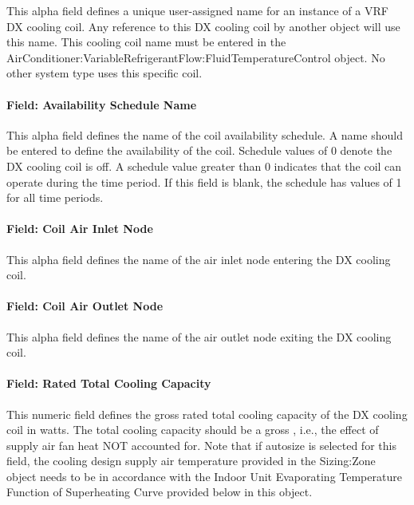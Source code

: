 This alpha field defines a unique user-assigned name for an instance of a VRF DX cooling coil. Any reference to this DX cooling coil by another object will use this name. This cooling coil name must be entered in the AirConditioner:VariableRefrigerantFlow:FluidTemperatureControl object. No other system type uses this specific coil.

\paragraph{Field: Availability Schedule Name}\label{field-availability-schedule-name-3-003}

This alpha field defines the name of the coil availability schedule. A name should be entered to define the availability of the coil. Schedule values of 0 denote the DX cooling coil is off. A schedule value greater than 0 indicates that the coil can operate during the time period. If this field is blank, the schedule has values of 1 for all time periods.

\paragraph{Field: Coil Air Inlet Node}\label{field-coil-air-inlet-node-1}

This alpha field defines the name of the air inlet node entering the DX cooling coil.

\paragraph{Field: Coil Air Outlet Node}\label{field-coil-air-outlet-node-1}

This alpha field defines the name of the air outlet node exiting the DX cooling coil.

\paragraph{Field: Rated Total Cooling Capacity}\label{field-rated-total-cooling-capacity}

This numeric field defines the gross rated total cooling capacity of the DX cooling coil in watts. The total cooling capacity should be a gross , i.e., the effect of supply air fan heat NOT accounted for. Note that if autosize is selected for this field, the cooling design supply air temperature provided in the Sizing:Zone object needs to be in accordance with the Indoor Unit Evaporating Temperature Function of Superheating Curve provided below in this object.

